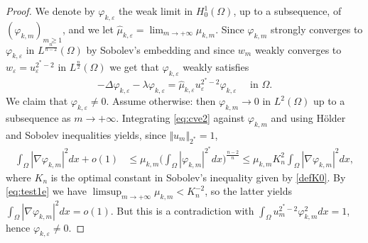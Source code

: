 \documentclass[10pt]{amsart}
\numberwithin{equation}{section}
\newcommand{\ve}{\varepsilon}
\newcommand{\vp}{\varphi}
\newcommand{\Om}{\Omega}
\theoremstyle{plain}
\theoremstyle{remark}
\begin{document}
\begin{proof}
We denote by $\vp_{k,\ve}$ the weak limit in $H^1_0(\Om)$, up to a subsequence, of $( \vp_{k,m} )_{m \ge 1}$, and we let $\hat{\mu}_{k,\ve} = \lim_{m \to +\infty} \mu_{k,m}$. Since $\vp_{k,m}$ strongly converges to $\vp_{k,\ve}$ in $L^\frac{n}{n-2}(\Om)$ by Sobolev's embedding and since $w_m$ weakly converges to $w_\ve = u_\ve^{2^*-2}$ in $L^{\frac{n}{2}}(\Om)$ we get that $\vp_{k,\ve}$ weakly satisfies
 \begin{equation} \label{eq:cve4}
  - \Delta \vp_{k,\ve} - \lambda \vp_{k,\ve} = \hat{\mu}_{k,\ve}  u_\ve^{2^*-2}\vp_{k,\ve} \quad \text{ in } \Om. 
 \end{equation}
We claim that $\vp_{k,\ve} \neq 0$. Assume otherwise: then $\vp_{k,m} \to 0$ in $L^2(\Om)$ up to a subsequence as $m \to + \infty$. Integrating \eqref{eq:cve2} against $\vp_{k,m}$ and using H\"older and Sobolev inequalities yields, since $\Vert u_m \Vert_{2^*} = 1$,
$$ \begin{aligned} \int_{\Om} |\nabla \vp_{k,m}|^2dx + o(1) & \le \mu_{k,m} \big( \int_{\Om} |\vp_{k,m}|^{2^*}dx \big)^{\frac{n-2}{n}}  \le \mu_{k,m}K_n^2  \int_{\Om} |\nabla \vp_{k,m}|^2dx, \end{aligned} $$
where $K_n$ is the optimal constant in Sobolev's inequality given by \eqref{defK0}. By \eqref{eq:test1e} we have $\limsup_{m \to  + \infty} \mu_{k,m} < K_n^{-2}$, so the latter yields $\int_{\Om} |\nabla \vp_{k,m}|^2 dx = o(1)$. But this is a contradiction with $\int_{\Om} u_m^{2^*-2} \vp_{k,m}^2dx = 1$, hence $\vp_{k,\ve} \neq 0$. 



\end{proof}
\end{document}
